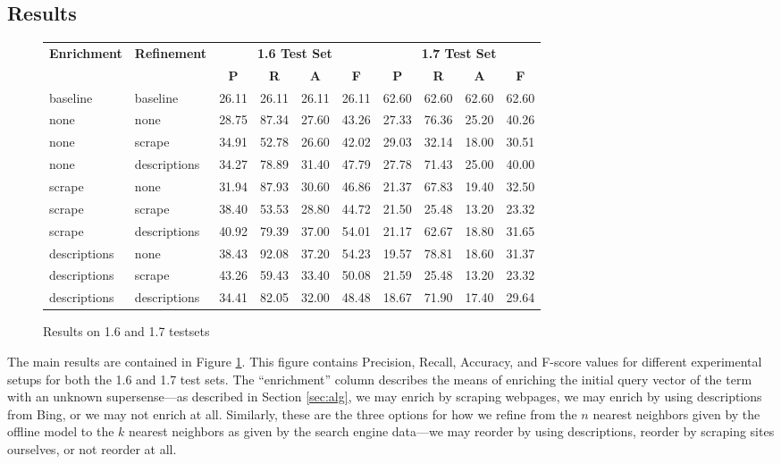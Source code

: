\documentclass{article}
\begin{document}
\subsection{Results}
\begin{figure}[hbtp]
\begin{center}
\begin{tabular}{|l|l||c|c|c|c||c|c|c|c|}
\hline
\multirow{2}{*}{{\bf Enrichment}} & \multirow{2}{*}{{\bf Refinement}} & \multicolumn{4}{c||}{{\bf 1.6 Test Set}} & \multicolumn{4}{c|}{{\bf 1.7 Test Set}}  \\
\cline{3-10}
& & {\bf P} & {\bf R} & {\bf A} & {\bf F} & {\bf P} & {\bf R} & {\bf A} & {\bf F} \\
\hline \hline
baseline & baseline & 26.11 & 26.11 & 26.11 & 26.11 & 62.60 & 62.60 & 62.60 & 62.60 \\
\hline\hline
none & none & 28.75 & 87.34 & 27.60 & 43.26 & 27.33 & 76.36 & 25.20 & 40.26  \\
\hline
none & scrape & 34.91 & 52.78 & 26.60 & 42.02  & 29.03 & 32.14 & 18.00 & 30.51\\
\hline
none & descriptions & 34.27 & 78.89 & 31.40 & 47.79 &  27.78 & 71.43 & 25.00 & 40.00\\
\hline\hline
scrape & none & 31.94 & 87.93 & 30.60 & 46.86 & 21.37 & 67.83 & 19.40 & 32.50  \\
\hline
scrape & scrape & 38.40 & 53.53 & 28.80 & 44.72 & 21.50 & 25.48 & 13.20 & 23.32 \\
\hline
scrape & descriptions & 40.92 & 79.39 & 37.00 & 54.01  & 21.17 & 62.67 & 18.80 & 31.65  \\
\hline\hline
descriptions & none & 38.43 & 92.08 & 37.20 & 54.23 & 19.57 & 78.81 & 18.60 & 31.37  \\
\hline
descriptions & scrape & 43.26 & 59.43 & 33.40 & 50.08 & 21.59 & 25.48 & 13.20 & 23.32 \\
\hline
descriptions & descriptions & 34.41 & 82.05 & 32.00 & 48.48 & 18.67 & 71.90 & 17.40 & 29.64   \\
\hline
\end{tabular}
\caption{Results on 1.6 and 1.7 testsets}
\label{fig:res}
\end{center}
\end{figure}
The main results are contained in Figure \ref{fig:res}.
This figure contains Precision, Recall, Accuracy, and F-score values for different experimental setups for both the 1.6 and 1.7 test sets.
The ``enrichment'' column describes the means of enriching the initial query vector of the term with an unknown supersense---as described in Section \ref{sec:alg}, we may enrich by scraping webpages, we may enrich by using descriptions from Bing, or we may not enrich at all.
Similarly, these are the three options for how we refine from the $n$ nearest neighbors given by the offline model to the $k$ nearest neighbors as given by the search engine data---we may reorder by using descriptions, reorder by scraping sites ourselves, or not reorder at all.
\end{document}
